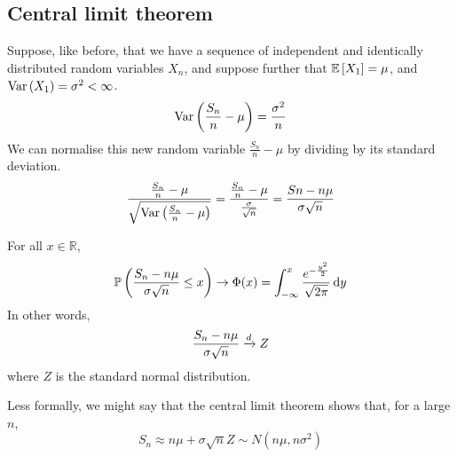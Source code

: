 \subsection{Central limit theorem}
Suppose, like before, that we have a sequence of independent and identically distributed random variables \(X_n\), and suppose further that \(\mathbb{E}\left[{X_1}\right] = \mu\), and \(\operatorname{Var}\left({X_1}\right) = \sigma^2 < \infty\).
\[
	\operatorname{Var}\left({\frac{S_n}{n} - \mu}\right) = \frac{\sigma^2}{n}
\]
We can normalise this new random variable \(\frac{S_n}{n} - \mu\) by dividing by its standard deviation.
\[
	\frac{\frac{S_n}{n} - \mu}{\sqrt{\operatorname{Var}\left({\frac{S_n}{n} - \mu}\right)}} = \frac{\frac{S_n}{n} - \mu}{\frac{\sigma}{\sqrt{n}}} = \frac{Sn - n\mu}{\sigma \sqrt{n}}
\]
\begin{theorem}
	For all \(x \in \mathbb R\),
	\[
		\mathbb{P}\left({\frac{S_n - n\mu}{\sigma \sqrt{n}} \leq x}\right) \to \Phi(x) = \int_{-\infty}^x \frac{e^{-\frac{y^2}{2}}}{\sqrt{2\pi}} \dd{y}
	\]
	In other words,
	\[
		\frac{S_n - n\mu}{\sigma \sqrt{n}} \xrightarrow{d} Z
	\]
	where \(Z\) is the standard normal distribution.
\end{theorem}
Less formally, we might say that the central limit theorem shows that, for a large \(n\),
\[
	S_n \approx n\mu + \sigma\sqrt{n}Z \sim N(n\mu, n\sigma^2)
\]
